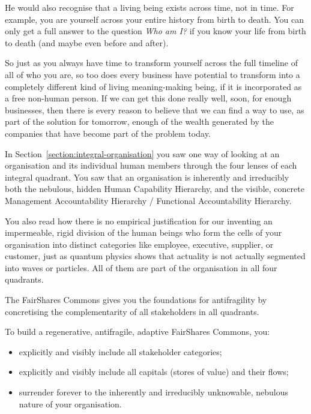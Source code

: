 He would also recognise that a living being exists across time, not in time. For example, you are yourself across your entire history from birth to death. You can only get a full answer to the question \emph{Who am I?} if you know your life from birth to death (and maybe even before and after). 


So just as you always have time to transform yourself across the full timeline of all of who you are, so too does every business have potential to transform into a completely different kind of living meaning\hyp{}making being, if it is incorporated as a free non-human person. If we can get this done really well, soon, for enough businesses, then there is every reason to believe that we can find a way to use, as part of the solution for tomorrow, enough of the wealth generated by the companies that have become part of the problem today.




In Section~\ref{section:integral-organisation} you saw one way of looking at an organisation and its individual human members through the four lenses of each integral quadrant. You saw that an organisation is inherently and irreducibly both the nebulous, hidden Human Capability Hierarchy, and the visible, concrete Management Accountability Hierarchy / Functional Accountability Hierarchy. 


You also read how there is no empirical justification for our inventing an impermeable, rigid division of the human beings who form the cells of your organisation into distinct categories like employee, executive, supplier, or customer, just as quantum physics shows that actuality is not actually segmented into waves or particles. All of them are part of the organisation in all four quadrants. 


The FairShares Commons  gives you the foundations for antifragility by concretising the complementarity of all stakeholders in all quadrants.


To build a regenerative, antifragile, adaptive FairShares Commons, you:


\begin{itemize}
\item  explicitly and visibly include all stakeholder categories;
\item  explicitly and visibly include all capitals (stores of value) and their flows;
\item  surrender forever to the inherently and irreducibly unknowable, nebulous nature of your organisation.
\end{itemize}


